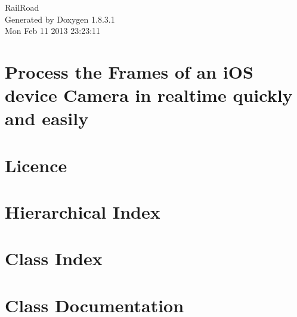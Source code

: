 \documentclass{book}
\begin{document}
\hypersetup{pageanchor=false,citecolor=blue}
\begin{titlepage}
\vspace*{7cm}
\begin{center}
{\Large Rail\-Road }\\
\vspace*{1cm}
{\large Generated by Doxygen 1.8.3.1}\\
\vspace*{0.5cm}
{\small Mon Feb 11 2013 23:23:11}\\
\end{center}
\end{titlepage}
\clearemptydoublepage
{}
\tableofcontents
\clearemptydoublepage
{}
\hypersetup{pageanchor=true,citecolor=blue}
\chapter{Process the Frames of an i\-O\-S device Camera in realtime quickly and easily}
\label{index}\hypertarget{index}{}
\chapter{Licence}
\label{Licence}
\hypertarget{Licence}{}

\chapter{Hierarchical Index}

\chapter{Class Index}

\chapter{Class Documentation}






\printindex
\end{document}
